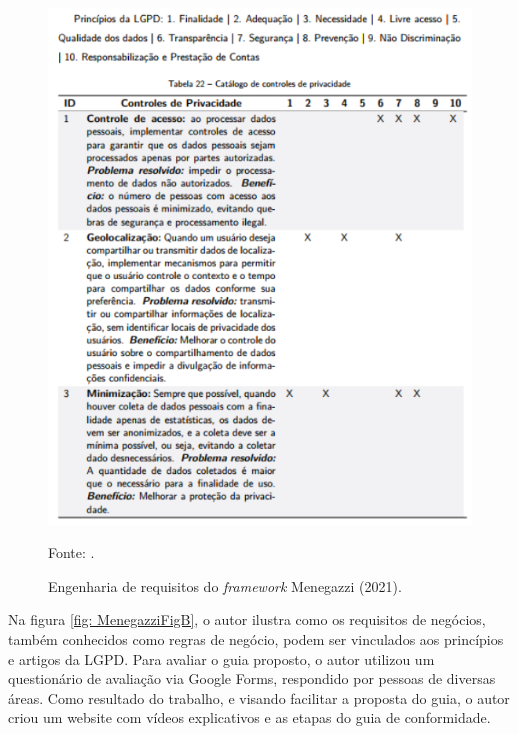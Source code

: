 \documentclass[
	12pt,				%
	openright,			%
	oneside,			%
	a4paper,			%
	english,			%
	french,				%
	spanish,			%
	brazil,				%
	]{abntex2}
\begin{document}
\begin{figure}[ht]
    \centering
    \caption{Engenharia de requisitos do \textit{framework} Menegazzi (2021).}
    \includegraphics[width=6.4in]{Images/09Menegazzi.png}
    \label{fig: Menegazzi}
    
    \centering \small Fonte: \cite{Menegazzi2021}.
\end{figure}

Na figura \ref{fig: MenegazziFigB}, o autor ilustra como os requisitos de negócios, também conhecidos como regras de negócio, podem ser vinculados aos princípios e artigos da LGPD. Para avaliar o guia proposto, o autor utilizou um questionário de avaliação via Google Forms, respondido por pessoas de diversas áreas. Como resultado do trabalho, e visando facilitar a proposta do guia, o autor criou um website com vídeos explicativos e as etapas do guia de conformidade.
\end{document}
